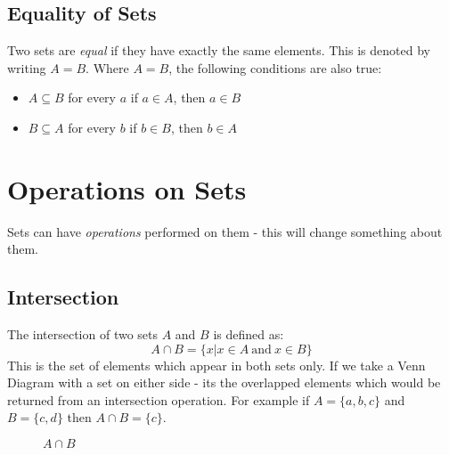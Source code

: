 \subsection{Equality of Sets}
Two sets are \textit{equal} if they have exactly the same elements. This is denoted by writing $A = B$. Where $A = B$, the following conditions are also true:
\begin{itemize}
    \item $A \subseteq B$ for every $a$ if $a \in A$, then $a \in B$
    \item $B \subseteq A$ for every $b$ if $b \in B$, then $b \in A$
\end{itemize}

\section{Operations on Sets}
Sets can have \textit{operations} performed on them - this will change something about them.
\subsection{Intersection}
The intersection of two sets $A$ and $B$ is defined as:
\[A \cap B = \{ x | x \in A \mathrm{\ and\ } x \in B \}\]
This is the set of elements which appear in both sets only. If we take a Venn Diagram with a set on either side -  its the overlapped elements which would be returned from an intersection operation. For example if $A = \{a, b, c\}$ and $B = \{c, d\}$ then $A \cap B = \{c\}$. 

\begin{figure}[H]
    \centering

    \caption{$A \cap B$}  
\end{figure}

